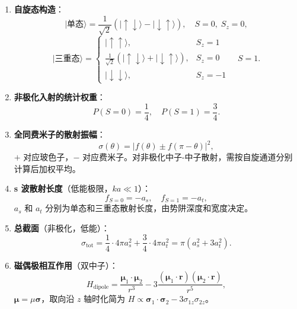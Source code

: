 \begin{formulabox}[核心公式]
\begin{enumerate}[label=\textbf{(\arabic*)}]
    \item \textbf{自旋态构造}：
    \[
    |\text{单态}\rangle=\frac{1}{\sqrt2}(|\uparrow\downarrow\rangle-|\downarrow\uparrow\rangle),\quad S=0,\;S_z=0,
    \]
    \[
    |\text{三重态}\rangle=\begin{cases}|\uparrow\uparrow\rangle,&S_z=1\\\frac{1}{\sqrt2}(|\uparrow\downarrow\rangle+|\downarrow\uparrow\rangle),&S_z=0\\|\downarrow\downarrow\rangle,&S_z=-1\end{cases}\quad S=1.
    \]

    \item \textbf{非极化入射的统计权重}：
    \[
    P(S=0)=\frac14,\quad P(S=1)=\frac34.
    \]

    \item \textbf{全同费米子的散射振幅}：
    \[
    \sigma(\theta)=|f(\theta)\pm f(\pi-\theta)|^2,
    \]
    $+$ 对应玻色子，$-$ 对应费米子。对非极化中子-中子散射，需按自旋通道分别计算后加权平均。

    \item \textbf{s 波散射长度}（低能极限，$ka\ll1$）：
    \[
    f_{S=0}=-a_s,\quad f_{S=1}=-a_t,
    \]
    $a_s$ 和 $a_t$ 分别为单态和三重态散射长度，由势阱深度和宽度决定。

    \item \textbf{总截面}（非极化，低能）：
    \[
    \sigma_{\text{tot}}=\frac14\cdot4\pi a_s^2+\frac34\cdot4\pi a_t^2=\pi(a_s^2+3a_t^2).
    \]

    \item \textbf{磁偶极相互作用}（双中子）：
    \[
    H_{\text{dipole}}=\frac{\boldsymbol{\mu}_1\cdot\boldsymbol{\mu}_2}{r^3}-3\frac{(\boldsymbol{\mu}_1\cdot\mathbf{r})(\boldsymbol{\mu}_2\cdot\mathbf{r})}{r^5},
    \]
    $\boldsymbol{\mu}=\mu\boldsymbol{\sigma}$，取向沿 $z$ 轴时化简为 $H\propto\boldsymbol{\sigma}_1\cdot\boldsymbol{\sigma}_2-3\sigma_{1z}\sigma_{2z}$。
\end{enumerate}
\end{formulabox}

